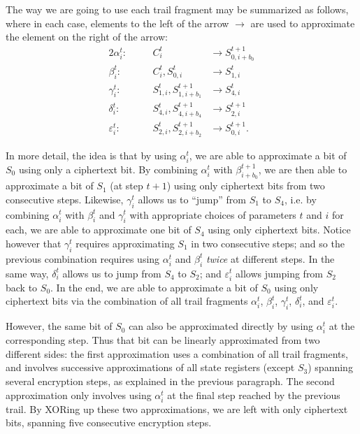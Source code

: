 \documentclass{llncs}
\begin{document}
The way we are going to use each trail fragment may be summarized as follows, where in each case, elements to the left of the arrow $\to$ are used to approximate the element on the right of the arrow:
\begin{alignat*}{2}
\alpha^t_i:\quad&& C^t_i &\to S^{t+1}_{0,i+b_0} \\
\beta^t_i:\quad&& C^t_i, S^t_{0,i} &\to S^t_{1,i} \\
\gamma^t_i:\quad&& S^t_{1,i}, S^{t+1}_{1,i+b_1} &\to S^t_{4,i} \\
\delta^t_i:\quad&& S^t_{4,i}, S^{t+1}_{4,i+b_4} &\to S^{t+1}_{2,i} \\
\varepsilon^t_i:\quad&& S^t_{2,i}, S^{t+1}_{2,i+b_2} &\to S^{t+1}_{0,i}.
\end{alignat*}

In more detail, the idea is that by using $\alpha^t_i$, we are able to approximate a bit of $S_0$ using only a ciphertext bit. By combining $\alpha^t_i$ with $\beta^{t+1}_{i+b_0}$, we are then able to approximate a bit of $S_1$ (at step $t+1$) using only ciphertext bits from two consecutive steps. Likewise, $\gamma^t_i$ allows us to ``jump'' from $S_1$ to $S_4$, i.e. by combining $\alpha^t_i$ with $\beta^t_i$ and $\gamma^t_i$ with appropriate choices of parameters $t$ and $i$ for each, we are able to approximate one bit of $S_4$ using only ciphertext bits. Notice however that $\gamma^t_i$ requires approximating $S_1$ in two consecutive steps; and so the previous combination requires using $\alpha^t_i$ and $\beta^t_i$ \emph{twice} at different steps. In the same way, $\delta^t_i$ allows us to jump from $S_4$ to $S_2$; and $\varepsilon^t_i$ allows jumping from $S_2$ back to $S_0$. In the end, we are able to approximate a bit of $S_0$ using only ciphertext bits via the combination of all trail fragments $\alpha^t_i$, $\beta^t_i$, $\gamma^t_i$, $\delta^t_i$, and $\varepsilon^t_i$.

However, the same bit of $S_0$ can also be approximated directly by using $\alpha^t_i$ at the corresponding step. Thus that bit can be linearly approximated from two different sides: the first approximation uses a combination of all trail fragments, and involves successive approximations of all state registers (except $S_3$) spanning several encryption steps, as explained in the previous paragraph. The second approximation only involves using $\alpha^t_i$ at the final step reached by the previous trail. By XORing up these two approximations, we are left with only ciphertext bits, spanning five consecutive encryption steps.
\end{document}
